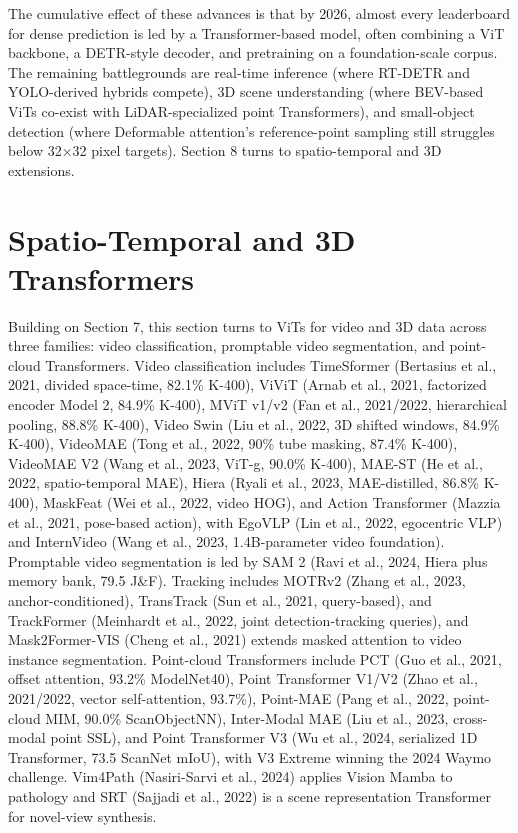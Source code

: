 The cumulative effect of these advances is that by 2026, almost every leaderboard for dense prediction is led by a Transformer-based model, often combining a ViT backbone, a DETR-style decoder, and pretraining on a foundation-scale corpus. The remaining battlegrounds are real-time inference (where RT-DETR and YOLO-derived hybrids compete), 3D scene understanding (where BEV-based ViTs co-exist with LiDAR-specialized point Transformers), and small-object detection (where Deformable attention's reference-point sampling still struggles below 32×32 pixel targets). Section 8 turns to spatio-temporal and 3D extensions.

\section{Spatio-Temporal and 3D Transformers}\label{spatio-temporal-and-3d-transformers}

Building on Section 7, this section turns to ViTs for video and 3D data across three families: video classification, promptable video segmentation, and point-cloud Transformers. Video classification includes TimeSformer (Bertasius et al., 2021, divided space-time, 82.1\% K-400), ViViT (Arnab et al., 2021, factorized encoder Model 2, 84.9\% K-400), MViT v1/v2 (Fan et al., 2021/2022, hierarchical pooling, 88.8\% K-400), Video Swin (Liu et al., 2022, 3D shifted windows, 84.9\% K-400), VideoMAE (Tong et al., 2022, 90\% tube masking, 87.4\% K-400), VideoMAE V2 (Wang et al., 2023, ViT-g, 90.0\% K-400), MAE-ST (He et al., 2022, spatio-temporal MAE), Hiera (Ryali et al., 2023, MAE-distilled, 86.8\% K-400), MaskFeat (Wei et al., 2022, video HOG), and Action Transformer (Mazzia et al., 2021, pose-based action), with EgoVLP (Lin et al., 2022, egocentric VLP) and InternVideo (Wang et al., 2023, 1.4B-parameter video foundation). Promptable video segmentation is led by SAM 2 (Ravi et al., 2024, Hiera plus memory bank, 79.5 J\&F). Tracking includes MOTRv2 (Zhang et al., 2023, anchor-conditioned), TransTrack (Sun et al., 2021, query-based), and TrackFormer (Meinhardt et al., 2022, joint detection-tracking queries), and Mask2Former-VIS (Cheng et al., 2021) extends masked attention to video instance segmentation. Point-cloud Transformers include PCT (Guo et al., 2021, offset attention, 93.2\% ModelNet40), Point Transformer V1/V2 (Zhao et al., 2021/2022, vector self-attention, 93.7\%), Point-MAE (Pang et al., 2022, point-cloud MIM, 90.0\% ScanObjectNN), Inter-Modal MAE (Liu et al., 2023, cross-modal point SSL), and Point Transformer V3 (Wu et al., 2024, serialized 1D Transformer, 73.5 ScanNet mIoU), with V3 Extreme winning the 2024 Waymo challenge. Vim4Path (Nasiri-Sarvi et al., 2024) applies Vision Mamba to pathology and SRT (Sajjadi et al., 2022) is a scene representation Transformer for novel-view synthesis.

